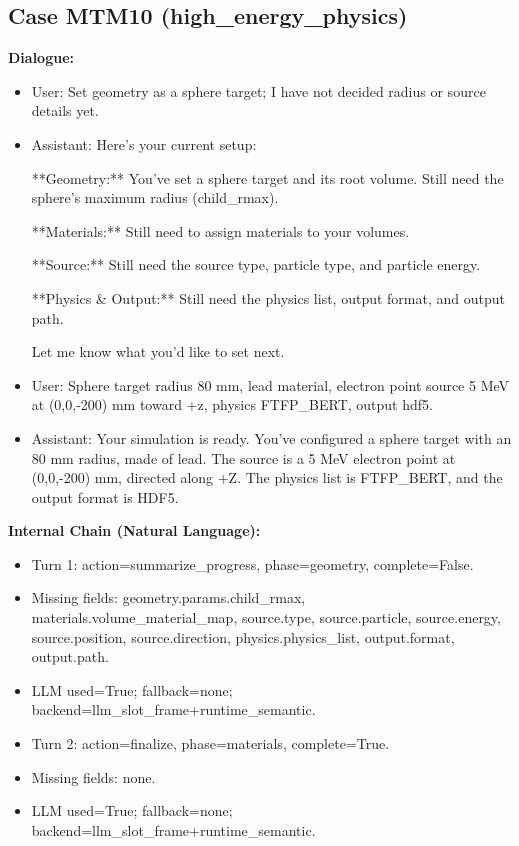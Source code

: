 \documentclass[11pt]{ctexart}
\begin{document}
\subsection{Case MTM10 (high\_energy\_physics)}
\textbf{Dialogue:}
\begin{itemize}
\item User: Set geometry as a sphere target; I have not decided radius or source details yet.
\item Assistant: Here's your current setup:

**Geometry:** You've set a sphere target and its root volume. Still need the sphere's maximum radius (child\_rmax).

**Materials:** Still need to assign materials to your volumes.

**Source:** Still need the source type, particle type, and particle energy.

**Physics \& Output:** Still need the physics list, output format, and output path.

Let me know what you'd like to set next.
\item User: Sphere target radius 80 mm, lead material, electron point source 5 MeV at (0,0,-200) mm toward +z, physics FTFP\_BERT, output hdf5.
\item Assistant: Your simulation is ready. You've configured a sphere target with an 80 mm radius, made of lead. The source is a 5 MeV electron point at (0,0,-200) mm, directed along +Z. The physics list is FTFP\_BERT, and the output format is HDF5.
\end{itemize}
\textbf{Internal Chain (Natural Language):}
\begin{itemize}
\item Turn 1: action=summarize\_progress, phase=geometry, complete=False.
\item Missing fields: geometry.params.child\_rmax, materials.volume\_material\_map, source.type, source.particle, source.energy, source.position, source.direction, physics.physics\_list, output.format, output.path.
\item LLM used=True; fallback=none; backend=llm\_slot\_frame+runtime\_semantic.
\item Turn 2: action=finalize, phase=materials, complete=True.
\item Missing fields: none.
\item LLM used=True; fallback=none; backend=llm\_slot\_frame+runtime\_semantic.
\end{itemize}
\end{document}
